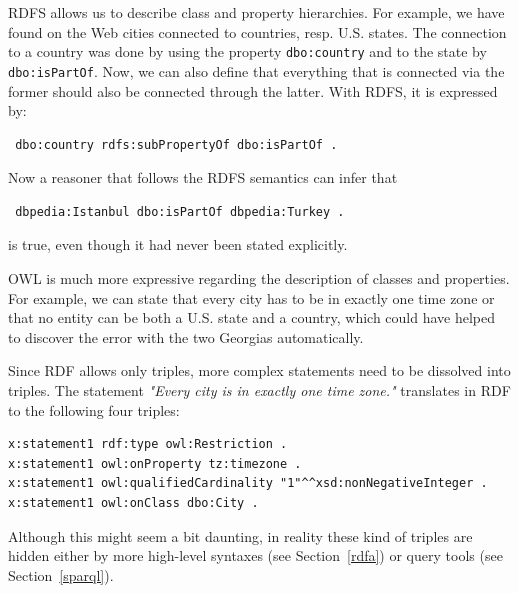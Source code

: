RDFS allows us to describe class and property hierarchies.
For example, we have found on the Web cities connected to countries, resp. U.S. states.
The connection to a country was done by using the property \texttt{dbo:country} and to the state by \texttt{dbo:isPartOf}.
Now, we can also define that everything that is connected via the former should also be connected through the latter.
With RDFS, it is expressed by:

\begin{verbatim}
 dbo:country rdfs:subPropertyOf dbo:isPartOf .
\end{verbatim}

Now a reasoner that follows the RDFS semantics can infer that

\begin{verbatim}
 dbpedia:Istanbul dbo:isPartOf dbpedia:Turkey .
\end{verbatim}

is true, even though it had never been stated explicitly.

OWL is much more expressive regarding the description of classes and properties.
For example, we can state that every city has to be in exactly one time zone or that no entity can be both a U.S. state and a country, which could have helped to discover the error with the two Georgias automatically.

Since \ac{RDF} allows only triples, more complex statements need to be dissolved into triples.
The statement \textit{"Every city is in exactly one time zone."} translates in \ac{RDF} to the following four triples:

\begin{verbatim}
x:statement1 rdf:type owl:Restriction .
x:statement1 owl:onProperty tz:timezone .
x:statement1 owl:qualifiedCardinality "1"^^xsd:nonNegativeInteger .
x:statement1 owl:onClass dbo:City .
\end{verbatim}

Although this might seem a bit daunting, in reality these kind of triples are hidden either by more high-level syntaxes (see Section~\ref{rdfa}) or query tools (see Section~\ref{sparql}).

%

